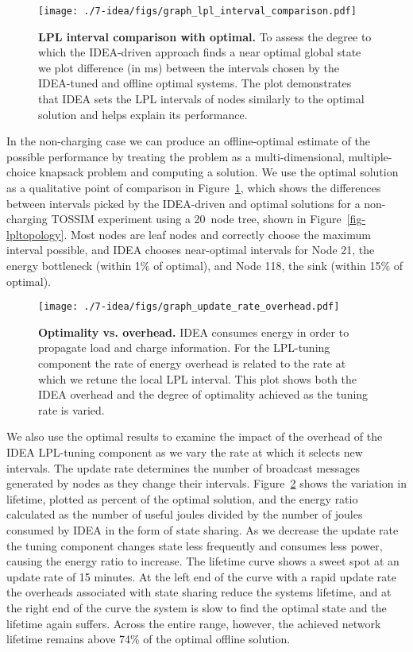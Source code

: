 \begin{figure}[t]
\begin{center}
\texttt{[image: ./7-idea/figs/graph\_lpl\_interval\_comparison.pdf]}
\end{center}
\caption{\small{\textbf{LPL interval comparison with optimal.} To assess the
degree to which the IDEA-driven approach finds a near optimal global state we
plot difference (in ms) between the intervals chosen by the IDEA-tuned and
offline optimal systems.  The plot demonstrates that IDEA sets the LPL
intervals of nodes similarly to the optimal solution and helps explain its
performance.}}
\label{fig-intervalvoptimal}
\end{figure}

In the non-charging case we can produce an offline-optimal estimate of the
possible performance by treating the problem as a multi-dimensional,
multiple-choice knapsack problem and computing a solution. We use the optimal
solution as a qualitative point of comparison in
Figure~\ref{fig-intervalvoptimal}, which shows the differences between
intervals picked by the IDEA-driven and optimal solutions for a non-charging
TOSSIM experiment using a 20~node tree, shown in
Figure~\ref{fig-lpltopology}. Most nodes are leaf nodes and correctly choose
the maximum interval possible, and IDEA chooses near-optimal intervals for
Node 21, the energy bottleneck (within 1\% of optimal), and Node 118, the
sink (within 15\% of optimal).

\begin{figure}[t]
\begin{center}
\texttt{[image: ./7-idea/figs/graph\_update\_rate\_overhead.pdf]}
\end{center}
\caption{\small{\textbf{Optimality vs. overhead.}
IDEA consumes energy in order to propagate load and charge information. For
the LPL-tuning component the rate of energy overhead is related to the rate
at which we retune the local LPL interval. This plot shows both the IDEA
overhead and the degree of optimality achieved as the tuning rate is varied.}}
\label{fig-lploverhead}
\end{figure}

We also use the optimal results to examine the impact of the overhead of the
IDEA LPL-tuning component as we vary the rate at which it selects new
intervals. The update rate determines the number of broadcast messages
generated by nodes as they change their intervals.
Figure~\ref{fig-lploverhead} shows the variation in lifetime, plotted as
percent of the optimal solution, and the energy ratio calculated as the
number of useful joules divided by the number of joules consumed by IDEA in
the form of state sharing. As we decrease the update rate the tuning
component changes state less frequently and consumes less power, causing the
energy ratio to increase. The lifetime curve shows a sweet spot at an update
rate of 15 minutes. At the left end of the curve with a rapid update rate the
overheads associated with state sharing reduce the systems lifetime, and at
the right end of the curve the system is slow to find the optimal state and
the lifetime again suffers.  Across the entire range, however, the achieved
network lifetime remains above 74\% of the optimal offline solution.


